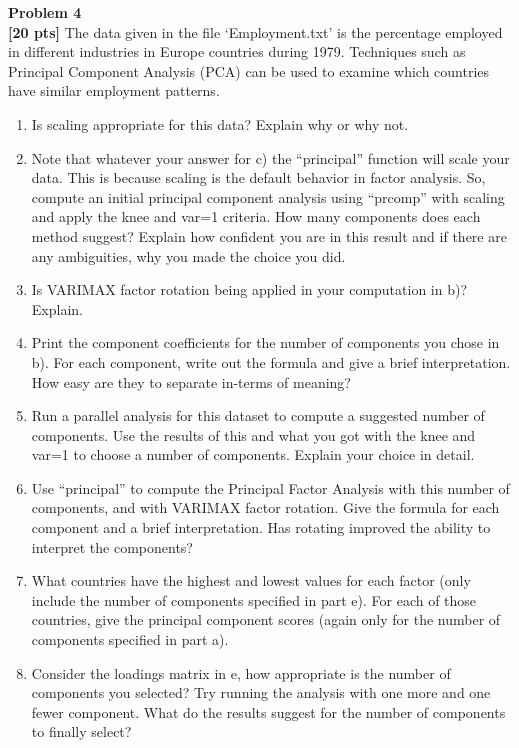 \documentclass{article}
\newenvironment{problem}[2][Problem]
    { \begin{mdframed}[backgroundcolor=gray!20] \textbf{#1 #2} \\}
    {  \end{mdframed}}
\begin{document}
\newpage
\begin{problem}{4}
\textbf{[20 pts]}
The data given in the file ‘Employment.txt’ is the percentage employed in different industries in Europe countries during 1979. Techniques such as Principal Component Analysis (PCA) can be used to examine which countries have similar employment patterns. 
\begin{enumerate}
\item Is scaling appropriate for this data? Explain why or why not.
\item Note that whatever your answer for c) the “principal” function will scale your data. This is because scaling is the default behavior in factor analysis. So, compute an initial principal component analysis using “prcomp” with scaling and apply the knee and var=1 criteria. How many components does each method suggest? Explain how confident you are in this result and if there are any ambiguities, why you made the choice you did.
\item Is VARIMAX factor rotation being applied in your computation in b)? Explain.
\item Print the component coefficients for the number of components you chose in b). For each component, write out the formula and give a brief interpretation. How easy are they to separate in-terms of meaning?
\item Run a parallel analysis for this dataset to compute a suggested number of components. Use the results of this and what you got with the knee and var=1 to choose a number of components. Explain your choice in detail.
\item Use “principal” to compute the Principal Factor Analysis with this number of components, and with VARIMAX factor rotation. Give the formula for each component and a brief interpretation. Has rotating improved the ability to interpret the components?
\item What countries have the highest and lowest values for each factor (only include the number of components specified in part e). For each of those countries, give the principal component scores (again only for the number of components specified in part a).
\item Consider the loadings matrix in e, how appropriate is the number of components you selected? Try running the analysis with one more and one fewer component. What do the results suggest for the number of components to finally select?
\end{enumerate}
\end{problem}
\end{document}
